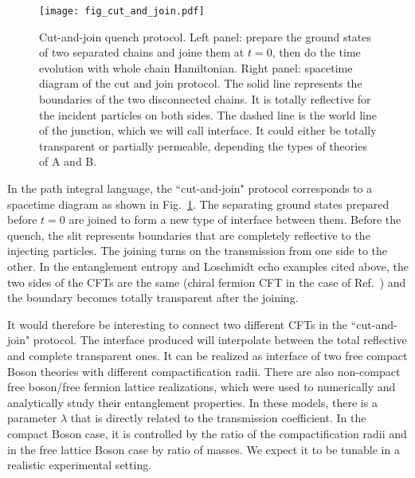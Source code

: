 \begin{figure}[h]
\texttt{[image: fig\_cut\_and\_join.pdf]}
\caption{Cut-and-join quench protocol. Left panel: prepare the ground states of two separated chains and joine them at $t = 0$, then do the time evolution with whole chain Hamiltonian. Right panel: spacetime diagram of the cut and join protocol. The solid line represents the boundaries of the two disconnected chains. It is totally reflective for the incident particles on both sides. The dashed line is the world line of the junction, which we will call interface. It could either be totally transparent or partially permeable, depending the types of theories of A and B.}
\label{fig:cut-and-join}
\end{figure}

In the path integral language, the ``cut-and-join" protocol corresponds to a spacetime diagram as shown in Fig.~\ref{fig:cut-and-join}. The separating ground states prepared before $t = 0$ are joined to form a new type of interface between them. Before the quench, the slit represents boundaries that are completely reflective to the injecting particles. The joining turns on the transmission from one side to the other. In the entanglement entropy and Loschmidt echo examples cited above\cite{calabrese_entanglement_2007, calabrese_quantum_2016, vasseur_universal_2014}, the two sides of the CFTs are the same (chiral fermion CFT in the case of Ref.~) and the boundary becomes totally transparent after the joining. 

It would therefore be interesting to connect two different CFTs in the ``cut-and-join" protocol. The interface produced will interpolate between the total reflective and complete transparent ones. It can be realized as interface of two free compact Boson theories with different compactification radii\cite{bachas_permeable_2002}. There are also non-compact free boson/free fermion lattice realizations, which were used to numerically and analytically\cite{peschel_exact_2012,sakai_entanglement_2008} study their entanglement properties. In these models, there is a parameter $\lambda$ that is directly related to the transmission coefficient. In the compact Boson case, it is controlled by the ratio of the compactification radii and in the free lattice Boson case by ratio of masses. We expect it to be tunable in a realistic experimental setting.

